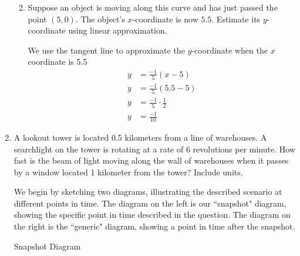 \documentclass{article}
\begin{document}
\begin{enumerate}
\begin{enumerate}
\begin{solution}
\end{solution}
    \item Suppose an object is moving along this curve and has just passed the point $(5, 0)$. The object's $x$-coordinate is now $5.5$. Estimate its $y$-coordinate using linear approximation.

\pspace{\vfill}

    \begin{solution}
    We use the tangent line to approximate the $y$-coordinate when the $x$ coordinate is 5.5
    \begin{align*}
        y&=\frac{-1}{5}(x-5)\\
        y&=\frac{-1}{5}(5.5-5)\\
        y&=\frac{-1}{5}\cdot\frac{1}{2}\\
        y&=\frac{-1}{10}
    \end{align*}
\end{solution}
\end{enumerate}

\pspace{\newpage}

\item
\begin{problem}
  A lookout tower is located 0.5 kilometers from a line of warehouses.  A
  searchlight on the tower is rotating at a rate of 6 revolutions per
  minute. How fast is the beam of light moving along the wall of
  warehouses when it passes by a window located 1 kilometer from the
  tower? Include units.
\end{problem}

\begin{solution}
    
    We begin by sketching two diagrams, illustrating the described scenario at different points in time. The diagram on the left is our ``snapshot" diagram, showing the specific point in time described in the question. The diagram on the right is the ``generic" diagram, showing a point in time after the snapshot. \\
\begin{multicols}{2}
Snapshot Diagram\\
\end{multicols}
\end{solution}
\end{enumerate}
\end{document}
